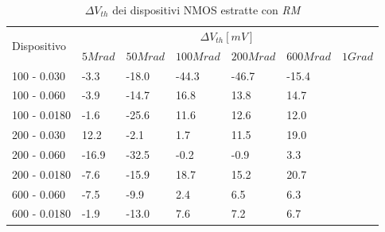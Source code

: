 \documentclass[
	a4paper,
	cleardoublepage=empty,
	headings=twolinechapter,
	numbers=autoenddot,
]{scrbook}
\begin{document}
\begin{table}[H]
  \renewcommand{\arraystretch}{1.3}
  \begin{tabular}{m{2.1cm}  m{1.1cm} m{1.3cm} m{1.5cm} m{1.5cm} m{1.5cm} m{1cm}}
    \toprule
    \multirow{2}{*}{Dispositivo} & \multicolumn{6}{c}{$\Delta V_{th} [mV] $}                                                          \\
    \cmidrule{2-7}
                                 & $5Mrad$                                   & $50Mrad$ & $100Mrad$ & $200Mrad$ & $600Mrad$ & $1Grad$ \\
    \midrule
    100 - 0.030                     & -3.3                                      & -18.0    & -44.3     & -46.7     & -15.4     &         \\
    \hline
    100 - 0.060                     & -3.9                                      & -14.7    & 16.8      & 13.8      & 14.7      &         \\
    \hline
    100 - 0.0180                    & -1.6                                      & -25.6    & 11.6      & 12.6      & 12.0      &         \\
    \hline
    200 - 0.030                     & 12.2                                      & -2.1     & 1.7       & 11.5      & 19.0      &         \\
    \hline
    200 - 0.060                     & -16.9                                     & -32.5    & -0.2      & -0.9      & 3.3       &         \\
    \hline
    200 - 0.0180                    & -7.6                                      & -15.9    & 18.7      & 15.2      & 20.7      &         \\
    \hline
    600 - 0.060                     & -7.5                                      & -9.9     & 2.4       & 6.5       & 6.3       &         \\
    \hline
    600 - 0.0180                    & -1.9                                      & -13.0    & 7.6       & 7.2       & 6.7       &         \\
    \bottomrule
  \end{tabular}
  \caption{$\Delta V_{th}$ dei dispositivi NMOS estratte con \emph{RM}}
  \label{tab:deltaVthRMN}
\end{table}
\end{document}
